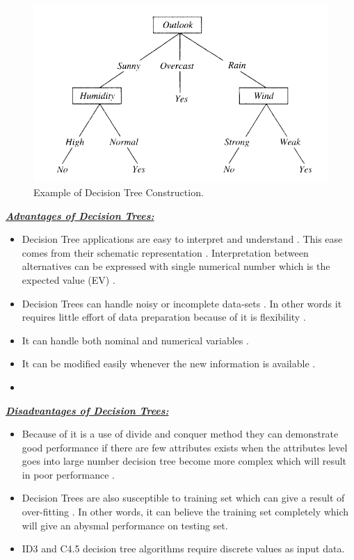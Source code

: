 \documentclass[sigconf]{acmart}
\begin{document}
 \begin{figure}[!ht]
  \centering
      \includegraphics[width=\columnwidth]{images/decison_tree.png}
  \caption{Example of Decision Tree Construction\cite{www-cs.princeton}.}\label{fig:Decision Tree}
\end{figure}

\textbf{\underline{\textit{Advantages of Decision Trees:}}}

\begin{itemize}
\item Decision Tree applications are easy to interpret and understand \cite{www-cs.ubb}. This ease comes from their schematic representation \cite{www-cs.ubb}. Interpretation between alternatives can be expressed with single numerical number which is the expected value (EV) \cite{www-cs.ubb}.  
\item Decision Trees can handle noisy or incomplete data-sets \cite{www-cs.ubb}. In other words it requires little effort of data preparation because of it is flexibility \cite{www-simafore}.  
\item It can handle both nominal and numerical variables \cite{www-cs.ubb}.
\item It can be modified easily whenever the new information is available \cite{www-cs.ubb}.
\item 
\end{itemize}


\textbf{\underline{\textit{Disadvantages of Decision Trees:}}}

\begin{itemize}
\item Because of it is a use of divide and conquer method they can demonstrate good performance if there are few attributes exists when the attributes level goes into large number decision tree become more complex which will result in poor performance \cite{www-cs.ubb}.
\item Decision Trees are also susceptible to training set which can give a result of over-fitting \cite{www-cs.ubb}. In other words, it can believe the training set completely which will give an abysmal performance on testing set.
\item ID3 and C4.5 decision tree algorithms require discrete values as input data. 
\end{itemize}
\end{document}
